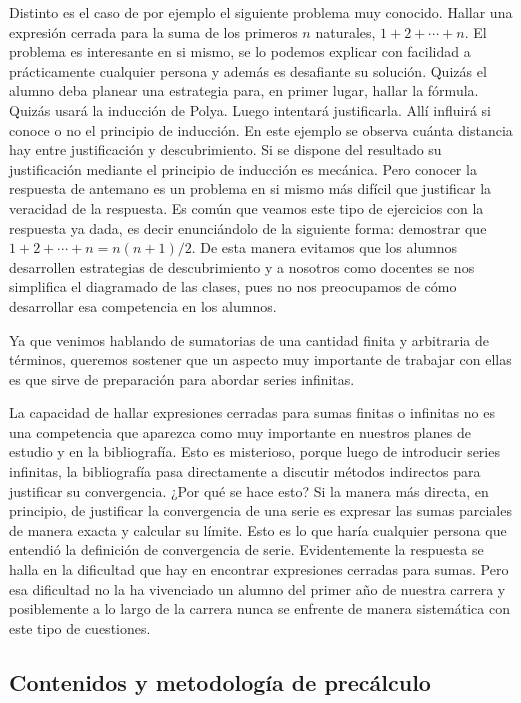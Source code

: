\documentclass[a4paper,10pt,BCOR10mm,oneside,headsepline]{scrbook}
\begin{document}
Distinto es el caso de por ejemplo el siguiente problema muy conocido.  Hallar una expresión cerrada para la suma de los primeros $n$ naturales, $1+2+\cdots+n$. El problema es interesante en si mismo, se lo podemos explicar con facilidad a prácticamente cualquier persona y además es desafiante su solución. Quizás el alumno deba planear una estrategia para, en primer lugar, hallar la fórmula. Quizás usará la inducción de Polya. Luego intentará justificarla. Allí influirá si conoce o no el principio de inducción. En este ejemplo se observa cuánta distancia hay entre justificación y descubrimiento. Si se dispone del resultado su justificación mediante el principio de inducción es mecánica. Pero conocer la respuesta de antemano es un problema en si mismo más difícil que justificar la veracidad de la respuesta. Es común que veamos este tipo de ejercicios con la respuesta ya dada, es decir enunciándolo de la siguiente forma: demostrar que $1+2+\cdots+n=n(n+1)/2$. De esta manera evitamos que los alumnos desarrollen estrategias de descubrimiento y a nosotros como docentes se nos simplifica el diagramado de las clases, pues no nos preocupamos de cómo  desarrollar esa competencia en los alumnos.  


Ya que venimos hablando de sumatorias de una cantidad finita y arbitraria de términos, queremos sostener que un aspecto muy importante  de trabajar con ellas es que sirve de  preparación para abordar series infinitas. 

La capacidad de hallar expresiones cerradas para sumas finitas o infinitas no es una competencia que aparezca como muy importante en nuestros planes de estudio y en la bibliografía. Esto es misterioso, porque luego de introducir series infinitas, la bibliografía  pasa directamente a discutir métodos indirectos para justificar su convergencia. ¿Por qué se hace esto? Si la manera más directa, en principio,  de justificar la convergencia de una serie es expresar las sumas parciales de manera exacta y calcular su límite. Esto es lo que haría cualquier persona que entendió la definición de convergencia de serie.   Evidentemente la respuesta se halla en la dificultad que hay en encontrar expresiones cerradas para sumas.  Pero esa dificultad no la ha vivenciado un alumno del primer año de nuestra carrera y posiblemente a lo largo de la carrera nunca se enfrente de manera sistemática con este tipo de cuestiones.






\subsection{Contenidos y metodología de precálculo}
\end{document}
